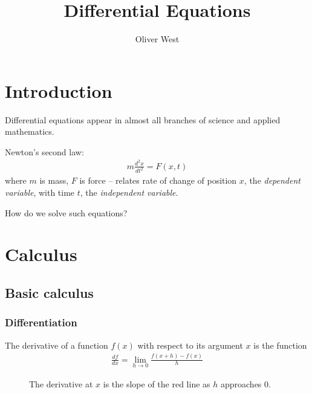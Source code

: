 \documentclass{../../template/note}
\author{Oliver West}
\title{Differential Equations}
\date{}
\begin{document}
    \maketitle

    \tableofcontents


    \setcounter{section}{-1}
    \section{Introduction}

    Differential equations appear in almost all branches of science and applied mathematics.

    \begin{example}
        Newton's second law:
        \begin{align*}
            m \frac{d^2x}{dt^2} = F(x,t)
        \end{align*}
        where \(m\) is mass, \(F\) is force -- relates rate of change of position \(x\), the \emph{dependent variable}, with time \(t\), the \emph{independent variable}. 
    \end{example}

    \noindent How do we solve such equations?

    \section{Calculus}

    \subsection{Basic calculus}

    \subsubsection{Differentiation}
    
    \begin{definition}
        The derivative of a function \(f(x)\) with respect to its argument \(x\) is the function
        \begin{align*}
            \frac{df}{dx}=\lim_{h\to 0}\frac{f(x+h)-f(x)}{h}
        \end{align*}

        \begin{figure}[ht]
            \centering
            \caption{The derivative at \(x\) is the slope of the red line as \(h\) approaches 0.}
            \label{fig:derivative-diagram}
        \end{figure}
    
    \end{definition}
\end{document}

